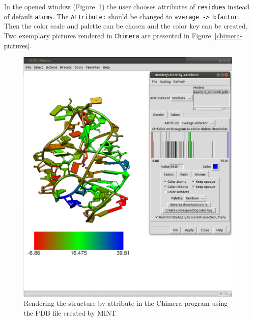 \documentclass[12pt]{article}
\begin{document}
In the opened window (Figure~\ref{chimera22}) the user chooses attributes of \texttt{residues} instead of default \texttt{atoms}. The \texttt{Attribute:} should be changed to \texttt{average -> bfactor}. Then the color scale and palette can be chosen and the color key can be created. Two exemplary pictures rendered in {\tt Chimera} are presented in Figure~\ref{chimera-pictures}.
\begin{figure}[!h]
\centering
\includegraphics[scale=0.3]{./pictures/chimera2.png}
\caption{Rendering the structure by attribute in the Chimera program using the PDB file created by MINT}
\label{chimera22}
\end{figure}
\end{document}
